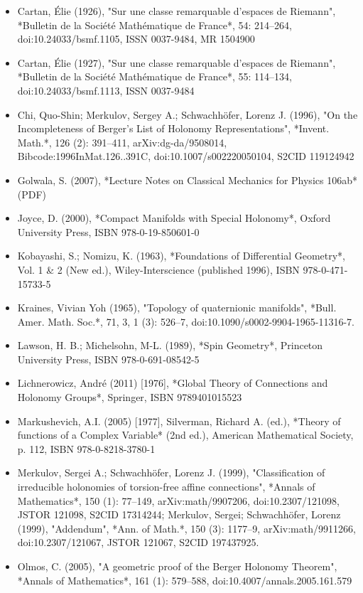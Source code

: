 \begin{itemize}
\item Cartan, Élie (1926), "Sur une classe remarquable d'espaces de Riemann", *Bulletin de la Société Mathématique de France*, 54: 214–264, doi:10.24033/bsmf.1105, ISSN 0037-9484, MR 1504900  
\item Cartan, Élie (1927), "Sur une classe remarquable d'espaces de Riemann", *Bulletin de la Société Mathématique de France*, 55: 114–134, doi:10.24033/bsmf.1113, ISSN 0037-9484  
\item Chi, Quo-Shin; Merkulov, Sergey A.; Schwachhöfer, Lorenz J. (1996), "On the Incompleteness of Berger's List of Holonomy Representations", *Invent. Math.*, 126 (2): 391–411, arXiv:dg-da/9508014, Bibcode:1996InMat.126..391C, doi:10.1007/s002220050104, S2CID 119124942  
\item Golwala, S. (2007), *Lecture Notes on Classical Mechanics for Physics 106ab* (PDF)  
\item Joyce, D. (2000), *Compact Manifolds with Special Holonomy*, Oxford University Press, ISBN 978-0-19-850601-0  
\item Kobayashi, S.; Nomizu, K. (1963), *Foundations of Differential Geometry*, Vol. 1 & 2 (New ed.), Wiley-Interscience (published 1996), ISBN 978-0-471-15733-5  
\item Kraines, Vivian Yoh (1965), "Topology of quaternionic manifolds", *Bull. Amer. Math. Soc.*, 71, 3, 1 (3): 526–7, doi:10.1090/s0002-9904-1965-11316-7.  
\item Lawson, H. B.; Michelsohn, M-L. (1989), *Spin Geometry*, Princeton University Press, ISBN 978-0-691-08542-5  
\item Lichnerowicz, André (2011) [1976], *Global Theory of Connections and Holonomy Groups*, Springer, ISBN 9789401015523  
\item Markushevich, A.I. (2005) [1977], Silverman, Richard A. (ed.), *Theory of functions of a Complex Variable* (2nd ed.), American Mathematical Society, p. 112, ISBN 978-0-8218-3780-1  
\item Merkulov, Sergei A.; Schwachhöfer, Lorenz J. (1999), "Classification of irreducible holonomies of torsion-free affine connections", *Annals of Mathematics*, 150 (1): 77–149, arXiv:math/9907206, doi:10.2307/121098, JSTOR 121098, S2CID 17314244; Merkulov, Sergei; Schwachhöfer, Lorenz (1999), "Addendum", *Ann. of Math.*, 150 (3): 1177–9, arXiv:math/9911266, doi:10.2307/121067, JSTOR 121067, S2CID 197437925.  
\item Olmos, C. (2005), "A geometric proof of the Berger Holonomy Theorem", *Annals of Mathematics*, 161 (1): 579–588, doi:10.4007/annals.2005.161.579
\end{itemize}